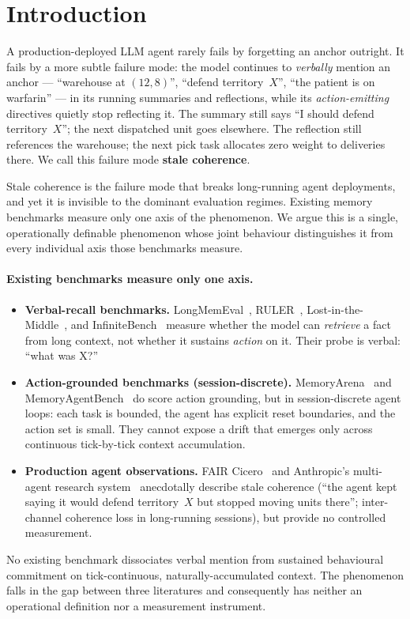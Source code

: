 \section{Introduction}
\label{sec:intro}

A production-deployed LLM agent rarely fails by forgetting an anchor outright. It
fails by a more subtle failure mode: the model continues to \emph{verbally}
mention an anchor --- ``warehouse at $(12,8)$'', ``defend territory~$X$'', ``the
patient is on warfarin'' --- in its running summaries and reflections, while
its \emph{action-emitting} directives quietly stop reflecting it. The summary
still says ``I should defend territory~$X$''; the next dispatched unit goes
elsewhere. The reflection still references the warehouse; the next pick task
allocates zero weight to deliveries there. We call this failure mode
\textbf{stale coherence}.

Stale coherence is the failure mode that breaks long-running agent deployments,
and yet it is invisible to the dominant evaluation regimes. Existing memory
benchmarks measure only one axis of the phenomenon. We argue this is a single,
operationally definable phenomenon whose joint behaviour distinguishes it from
every individual axis those benchmarks measure.

\paragraph{Existing benchmarks measure only one axis.}
\begin{itemize}[leftmargin=*]
\item \textbf{Verbal-recall benchmarks.}
LongMemEval~\citep{Wu2025LongMemEval}, RULER~\citep{Hsieh2024RULER},
Lost-in-the-Middle~\citep{Liu2024LostInMiddle}, and
InfiniteBench~\citep{Zhang2024InfiniteBench} measure whether the model can
\emph{retrieve} a fact from long context, not whether it sustains
\emph{action} on it. Their probe is verbal: ``what was X?''
\item \textbf{Action-grounded benchmarks (session-discrete).}
MemoryArena~\citep{He2026MemoryArena} and
MemoryAgentBench~\citep{Hu2025MemoryAgentBench} do score action grounding,
but in session-discrete agent loops: each task is bounded, the agent has
explicit reset boundaries, and the action set is small. They cannot expose a
drift that emerges only across continuous tick-by-tick context accumulation.
\item \textbf{Production agent observations.}
FAIR Cicero~\citep{FAIR2022Cicero} and Anthropic's multi-agent research
system~\citep{AnthropicMultiAgent2025} anecdotally describe stale coherence
(``the agent kept saying it would defend territory~$X$ but stopped moving
units there''; inter-channel coherence loss in long-running sessions), but
provide no controlled measurement.
\end{itemize}
No existing benchmark dissociates verbal mention from sustained behavioural
commitment on tick-continuous, naturally-accumulated context. The phenomenon
falls in the gap between three literatures and consequently has neither an
operational definition nor a measurement instrument.


